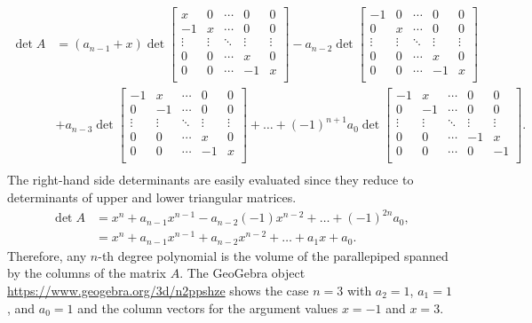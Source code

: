 \documentclass[graybox]{svmult}
\begin{document}
{\tiny
\begin{align*}
\det A &= (a_{n-1} + x) \det\left[\begin{array}{ccccc}
x  & 0 & \cdots & 0 & 0 \\
-1 & x & \cdots & 0 & 0 \\
\vdots & \vdots & \ddots & \vdots & \vdots \\
0  & 0 & \cdots & x & 0 \\
0  & 0 & \cdots & -1 & x \\
\end{array}\right]
 -a_{n-2} \det\left[\begin{array}{ccccc}
-1 & 0 & \cdots & 0 & 0 \\
0  & x & \cdots & 0 & 0 \\
\vdots & \vdots & \ddots & \vdots & \vdots \\
0  & 0 & \cdots & x & 0 \\
0  & 0 & \cdots & -1 & x \\
\end{array}\right]\\
 &+a_{n-3} \det\left[\begin{array}{ccccc}
-1 & x & \cdots & 0 & 0 \\
0 & -1 & \cdots & 0 & 0 \\
\vdots & \vdots & \ddots & \vdots & \vdots \\
0  & 0 & \cdots & x & 0 \\
0  & 0 & \cdots & -1 & x \\
\end{array}\right] + \ldots + (-1)^{n+1} a_0 \det\left[\begin{array}{ccccc}
-1 & x & \cdots & 0 & 0 \\
0 & -1 & \cdots & 0 & 0 \\
\vdots & \vdots & \ddots & \vdots & \vdots \\
0  & 0 & \cdots & -1 & x \\
0  & 0 & \cdots & 0  & -1 \\
\end{array}\right].\\
\end{align*}
}
The right-hand side determinants are easily evaluated since they
reduce to determinants of upper and lower triangular matrices.
\begin{align*}
\det A &= x^n + a_{n-1} x^{n-1} - a_{n-2} (-1) x^{n-2} + \ldots + (-1)^{2n} a_0,\\
 &= x^n + a_{n-1} x^{n-1} + a_{n-2} x^{n-2} + \ldots + a_1 x + a_0.
\end{align*}
Therefore, any $n$-th degree polynomial is the volume of the parallepiped
spanned by the columns of the matrix $A$. The GeoGebra object \url{https://www.geogebra.org/3d/n2ppshze} shows the case $n=3$ with $a_2=1$, $a_1=1$, and $a_0=1$ and the column vectors for the argument values $x=-1$ and $x=3$.
\end{document}
